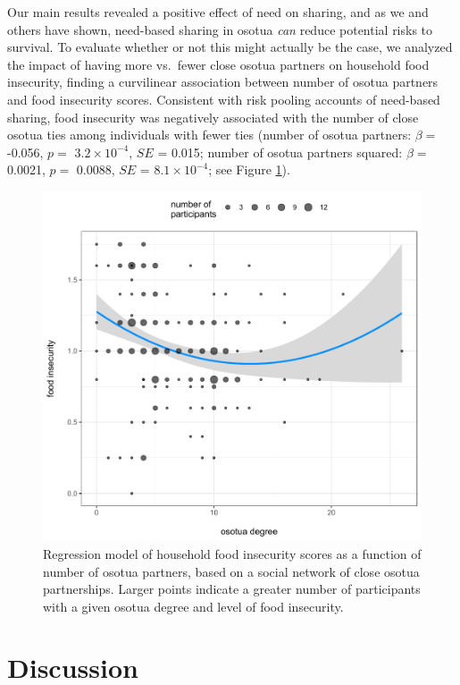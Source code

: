 \documentclass[
]{article}
\begin{document}
Our main results revealed a positive effect of need on sharing, and as we and others have shown, need-based sharing in osotua \emph{can} reduce potential risks to survival. To evaluate whether or not this might actually be the case, we analyzed the impact of having more vs.~fewer close osotua partners on household food insecurity, finding a curvilinear association between number of osotua partners and food insecurity scores. Consistent with risk pooling accounts of need-based sharing, food insecurity was negatively associated with the number of close osotua ties among individuals with fewer ties (number of osotua partners: \(\beta=\) -0.056, \(p=\) \ensuremath{3.2\times 10^{-4}}, \(SE\) = 0.015; number of osotua partners squared: \(\beta=\) 0.0021, \(p=\) 0.0088, \(SE\) = \ensuremath{8.1\times 10^{-4}}; see Figure \ref{fig:osotuainsecure}).

\begin{figure}
\centering
\includegraphics{needBasedSharing-paper_files/figure-latex/osotuainsecure-1.pdf}
\caption{\label{fig:osotuainsecure}Regression model of household food insecurity scores as a function of number of osotua partners, based on a social network of close osotua partnerships. Larger points indicate a greater number of participants with a given osotua degree and level of food insecurity.}
\end{figure}

\section*{Discussion}\label{discussion}
\end{document}
